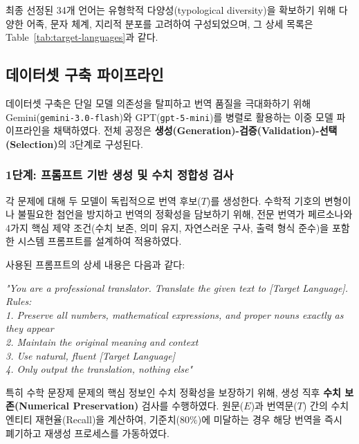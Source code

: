 최종 선정된 34개 언어는 유형학적 다양성(typological diversity)을 확보하기 위해 다양한 어족, 문자 체계, 지리적 분포를 고려하여 구성되었으며, 그 상세 목록은 Table~\ref{tab:target-languages}과 같다.



\subsection{데이터셋 구축 파이프라인}
데이터셋 구축은 단일 모델 의존성을 탈피하고 번역 품질을 극대화하기 위해 Gemini(\texttt{gemini-3.0-flash})와 GPT(\texttt{gpt-5-mini})를 병렬로 활용하는 이중 모델 파이프라인을 채택하였다. 전체 공정은 \textbf{생성(Generation)-검증(Validation)-선택(Selection)}의 3단계로 구성된다.

\subsubsection{1단계: 프롬프트 기반 생성 및 수치 정합성 검사}
\label{sec:pre-filtering}

각 문제에 대해 두 모델이 독립적으로 번역 후보($T$)를 생성한다. 수학적 기호의 변형이나 불필요한 첨언을 방지하고 번역의 정확성을 담보하기 위해, 전문 번역가 페르소나와 4가지 핵심 제약 조건(수치 보존, 의미 유지, 자연스러운 구사, 출력 형식 준수)을 포함한 시스템 프롬프트를 설계하여 적용하였다.

사용된 프롬프트의 상세 내용은 다음과 같다:

\begin{tcolorbox}[ colback=gray!5, colframe=black, boxrule=0.6pt, arc=6pt, left=8pt, right=8pt, top=6pt, bottom=6pt, title=Translation System Prompt ] 
\small
\textit{ "You are a professional translator. Translate the given text to [Target Language]. \\ Rules: \\ 1. Preserve all numbers, mathematical expressions, and proper nouns exactly as they appear \\ 2. Maintain the original meaning and context \\ 3. Use natural, fluent [Target Language] \\ 4. Only output the translation, nothing else" } 
\end{tcolorbox}

특히 수학 문장제 문제의 핵심 정보인 수치 정확성을 보장하기 위해, 생성 직후 \textbf{수치 보존(Numerical Preservation)} 검사를 수행하였다. 원문($E$)과 번역문($T$) 간의 수치 엔티티 재현율(Recall)을 계산하여, 기준치($80\%$)에 미달하는 경우 해당 번역을 즉시 폐기하고 재생성 프로세스를 가동하였다.

